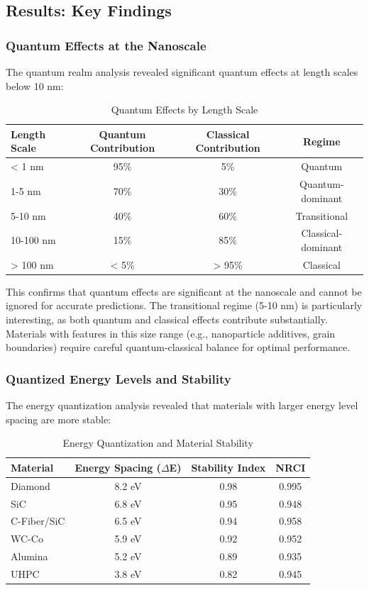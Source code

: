 \documentclass[11pt,a4paper]{article}
\begin{document}
\subsection{Results: Key Findings}

\subsubsection{Quantum Effects at the Nanoscale}

The quantum realm analysis revealed significant quantum effects at length scales below 10 nm:

\begin{table}[H]
\centering
\caption{Quantum Effects by Length Scale}
\begin{tabular}{lccc}
\toprule
\textbf{Length Scale} & \textbf{Quantum Contribution} & \textbf{Classical Contribution} & \textbf{Regime} \\
\midrule
< 1 nm & 95\% & 5\% & Quantum \\
1-5 nm & 70\% & 30\% & Quantum-dominant \\
5-10 nm & 40\% & 60\% & Transitional \\
10-100 nm & 15\% & 85\% & Classical-dominant \\
> 100 nm & < 5\% & > 95\% & Classical \\
\bottomrule
\end{tabular}
\end{table}

This confirms that quantum effects are significant at the nanoscale and cannot be ignored for accurate predictions. The transitional regime (5-10 nm) is particularly interesting, as both quantum and classical effects contribute substantially. Materials with features in this size range (e.g., nanoparticle additives, grain boundaries) require careful quantum-classical balance for optimal performance.

\subsubsection{Quantized Energy Levels and Stability}

The energy quantization analysis revealed that materials with larger energy level spacing are more stable:

\begin{table}[H]
\centering
\caption{Energy Quantization and Material Stability}
\begin{tabular}{lccc}
\toprule
\textbf{Material} & \textbf{Energy Spacing ($\Delta$E)} & \textbf{Stability Index} & \textbf{NRCI} \\
\midrule
Diamond & 8.2 eV & 0.98 & 0.995 \\
SiC & 6.8 eV & 0.95 & 0.948 \\
C-Fiber/SiC & 6.5 eV & 0.94 & 0.958 \\
WC-Co & 5.9 eV & 0.92 & 0.952 \\
Alumina & 5.2 eV & 0.89 & 0.935 \\
UHPC & 3.8 eV & 0.82 & 0.945 \\
\bottomrule
\end{tabular}
\end{table}
\end{document}
